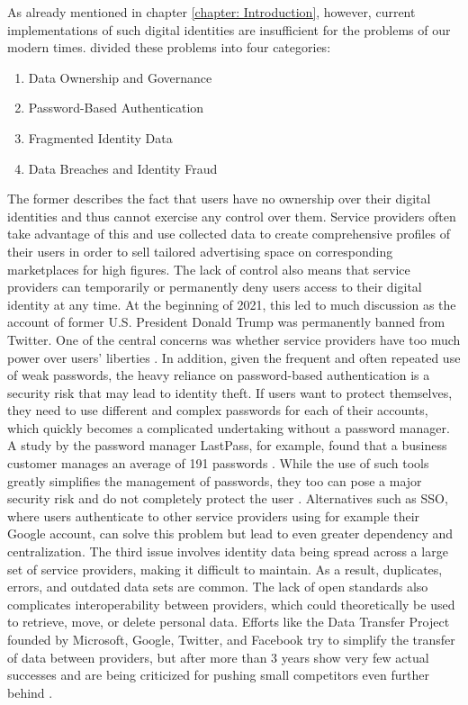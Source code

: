 As already mentioned in chapter \ref{chapter: Introduction}, however, current implementations of such digital identities are insufficient for the problems of our modern times. \cite{soltani_survey_2021} divided these problems into four categories:
\begin{enumerate}
	\item Data Ownership and Governance
	\item Password-Based Authentication
	\item Fragmented Identity Data
	\item Data Breaches and Identity Fraud
\end{enumerate}
The former describes the fact that users have no ownership over their digital identities and thus cannot exercise any control over them. Service providers often take advantage of this and use collected data to create comprehensive profiles of their users in order to sell tailored advertising space on corresponding marketplaces for high figures. The lack of control also means that service providers can temporarily or permanently deny users access to their digital identity at any time. At the beginning of 2021, this led to much discussion as the account of former U.S. President Donald Trump was permanently banned from Twitter. One of the central concerns was whether service providers have too much power over users' liberties \cite{noor_should_2021}. In addition, given the frequent and often repeated use of weak passwords, the heavy reliance on password-based authentication is a security risk that may lead to identity theft. If users want to protect themselves, they need to use different and complex passwords for each of their accounts, which quickly becomes a complicated undertaking without a password manager. A study by the password manager LastPass, for example, found that a business customer manages an average of 191 passwords \cite{steel_lastpass_2017}. While the use of such tools greatly simplifies the management of passwords, they too can pose a major security risk and do not completely protect the user \cite{oesch_that_2020, ormandy_password_2021, toth_you_2021}. Alternatives such as \acf{SSO}, where users authenticate to other service providers using for example their Google account, can solve this problem but lead to even greater dependency and centralization. The third issue involves identity data being spread across a large set of service providers, making it difficult to maintain. As a result, duplicates, errors, and outdated data sets are common. The lack of open standards also complicates interoperability between providers, which could theoretically be used to retrieve, move, or delete personal data. Efforts like the Data Transfer Project founded by Microsoft, Google, Twitter, and Facebook try to simplify the transfer of data between providers, but after more than 3 years show very few actual successes \cite{minor_google_2020, hollington_surprising_2021, lomas_facebooks_2020} and are being criticized for pushing small competitors even further behind \cite[p. 15]{borgogno_data_2018}. \cite[pp. 2-3]{soltani_survey_2021}

